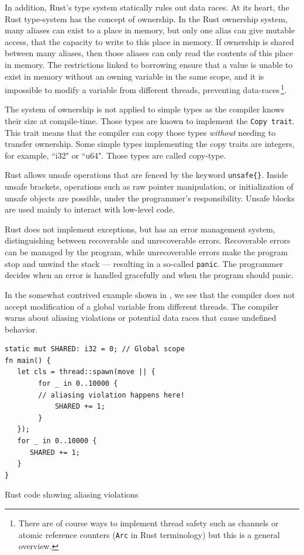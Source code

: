 \documentclass[nomenclature, english, bibtex]{kththesis}
\begin{document}
In addition, Rust’s type system statically rules out data races. At its heart, the Rust type-system has the concept of ownership. In the Rust ownership system, many aliases can exist to a place in memory, but only one alias can give mutable access, that the capacity to write to this place in memory. If ownership is shared between many aliases, then those aliases can only read the contents of this place in memory. The restrictions linked to borrowing ensure that a value is unable to exist in memory without an owning variable in the same scope, and it is impossible to modify a variable from different threads, preventing data-races\,\cite{poveda_ruiz_bounded_2019,noauthor_rust_nodate}\footnote{There are of course ways to implement thread safety such as channels or atomic reference counters (\texttt{Arc} in Rust terminology) but this is a general overview.}. 

The system of ownership is not applied to simple types as the compiler knows their size at compile-time. Those types are known to implement the \texttt{Copy trait}. This trait means that the compiler can copy those types \emph{without} needing to transfer ownership. Some simple types implementing the copy traits are integers, for example, ``i32" or ``u64". Those types are called \gls{copy-type}.

Rust allows unsafe operations that are fenced by the keyword \texttt{unsafe\{\}}. Inside unsafe brackets, operations such as raw pointer manipulation, or initialization of unsafe objects are possible, under the programmer's responsibility. Unsafe blocks are used mainly to interact with low-level code.

Rust does not implement exceptions, but has an error management system, distinguishing between recoverable and unrecoverable errors. Recoverable errors can be managed by the program, while unrecoverable errors make the program stop and unwind the stack --- resulting in a so-called \texttt{panic}. The programmer decides when an error is handled gracefully and when the program should panic.

In the somewhat contrived  example shown in , we see that the compiler does not accept modification of a global variable from different threads. The compiler warns about aliasing violations or potential data races that cause undefined behavior.
\begin{listing}[!ht]
\begin{verbatim}
static mut SHARED: i32 = 0; // Global scope
fn main() {
   let cls = thread::spawn(move || {
        for _ in 0..10000 {
        // aliasing violation happens here!
            SHARED += 1;
        }
   });
   for _ in 0..10000 {
      SHARED += 1;
   }
}
\end{verbatim}
\caption[Rust code showing aliasing violations]{Rust code showing aliasing violations}
\label{lstlisting:data_race}
\end{listing}
\FloatBarrier
\end{document}
